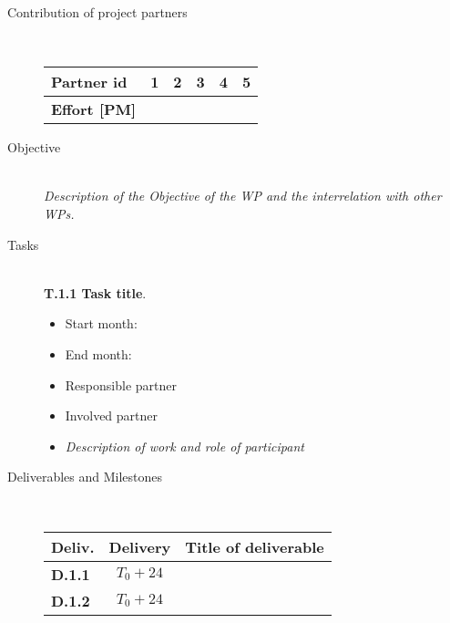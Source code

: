 \begin{description}

  \item[Contribution of project partners]~\\
        \begin{tabular}{|l||c|c|c|c|c|}
            \hline
            \rowcolor{lightgray}
            \textbf{Partner id}  & 1 & 2 & 3 & 4 & 5 \\\hline
            \textbf{Effort [PM]} & & & & & \\\hline
        \end{tabular}    
  \item[Objective]~\\
    \emph{Description of the Objective of the WP and the interrelation with other WPs.}

  \item[Tasks]~\\
    \textbf{T.1.1 Task title}.
    \begin{itemize}
      \item Start month:
      \item End month:
      \item Responsible partner
      \item Involved partner
      \item \emph{Description of work and role of participant}
    \end{itemize}
    
  \item[Deliverables and Milestones]~\\[1em]
        \begin{tabular}{|l||c|p{}|}
            \hline
            \rowcolor{lightgray}
            \textbf{Deliv.} & \textbf{Delivery} & \textbf{Title of
              deliverable}\\\hline
            \hline
            \textbf{D.1.1} & $T_{0}+24$ & \\\hline
            \textbf{D.1.2} & $T_{0}+24$ & \\\hline
            
            

        \end{tabular}    
\end{description}



% 
